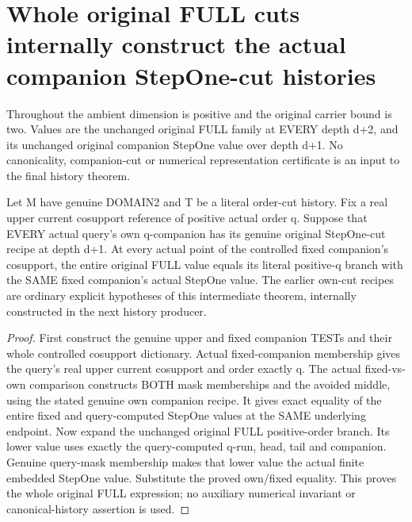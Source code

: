 \section{Whole original FULL cuts internally construct the actual companion StepOne-cut histories}

Throughout the ambient dimension is positive and the original carrier bound
is two. Values are the unchanged original FULL family at EVERY depth d+2,
and its unchanged original companion StepOne value over depth d+1.
No canonicality, companion-cut or numerical representation certificate is
an input to the final history theorem.

\begin{theorem}
\label{hir:original-own-recipes-fixed-companion-full-value-law}
\leanok
Let M have genuine DOMAIN2 and T be a literal order-cut history. Fix a real
upper current cosupport reference of positive actual order q. Suppose that
EVERY actual query's own q-companion has its genuine original StepOne-cut
recipe at depth d+1. At every actual point of the controlled fixed
companion's cosupport, the entire original FULL value equals its literal
positive-q branch with the SAME fixed companion's actual StepOne value.
The earlier own-cut recipes are ordinary explicit hypotheses of this
intermediate theorem, internally constructed in the next history producer.
\end{theorem}
\begin{proof}
First construct the genuine upper and fixed companion TESTs and their
whole controlled cosupport dictionary. Actual fixed-companion membership
gives the query's real upper current cosupport and order exactly q.
The actual fixed-vs-own comparison constructs BOTH mask memberships and
the avoided middle, using the stated genuine own companion recipe. It
gives exact equality of the entire fixed and query-computed StepOne values
at the SAME underlying endpoint. Now expand the unchanged original FULL
positive-order branch. Its lower value uses exactly the query-computed
q-run, head, tail and companion. Genuine query-mask membership makes that
lower value the actual finite embedded StepOne value. Substitute the
proved own/fixed equality. This proves the whole original FULL expression;
no auxiliary numerical invariant or canonical-history assertion is used.
\end{proof}

